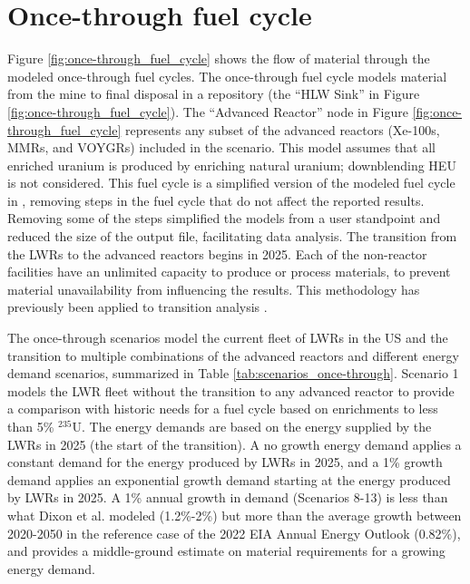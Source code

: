 \section{Once-through fuel cycle} \label{sec:once-through-methods}
Figure \ref{fig:once-through_fuel_cycle} shows the flow of material through 
the modeled once-through fuel cycles. The once-through fuel cycle models 
material from the mine to final disposal in a repository (the 
``HLW Sink'' in Figure \ref{fig:once-through_fuel_cycle}). The 
``Advanced Reactor'' node in Figure 
\ref{fig:once-through_fuel_cycle} represents any subset of the advanced 
reactors (Xe-100s, \glspl{MMR}, and VOYGRs) included 
in the scenario. This model assumes that all enriched uranium is produced 
by enriching natural uranium; downblending \gls{HEU} is not considered. 
This fuel cycle is a simplified version of the modeled fuel cycle in 
\cite{bachmann_enrichment_2021}, removing steps in the fuel cycle that 
do not affect the reported results. Removing some of the steps simplified 
the models from a user standpoint and reduced the size of the \Cyclus 
output file, facilitating data analysis. The transition from the 
\glspl{LWR} to the advanced reactors begins in 2025. Each of the non-reactor 
facilities have an unlimited capacity to produce or process materials,
to prevent material unavailability from influencing the results. 
This methodology has previously been applied to transition analysis 
\cite{djokic_application_2015}.



The once-through scenarios model the current fleet of \glspl{LWR} in the 
US and the transition to multiple 
combinations of the advanced reactors and different energy demand scenarios, 
summarized in Table \ref{tab:scenarios_once-through}. Scenario 1 models
the \gls{LWR} fleet without the transition to any advanced reactor to 
provide 
a comparison with historic needs for a fuel cycle 
based on enrichments to less than 5\% $^{235}$U. The energy demands are 
based on the energy supplied by the \glspl{LWR} in 2025 (the start of 
the transition). A no growth energy demand applies a constant demand for 
the energy produced by \glspl{LWR} in 2025, and a 1\% growth demand applies 
an exponential growth demand starting at the energy produced by 
\glspl{LWR} in 2025. A 1\% annual growth in 
demand (Scenarios 8-13) is less than what Dixon et al. \cite{dixon_estimated_2022} 
modeled
(1.2\%-2\%) but more than the average growth between 2020-2050 in the 
reference case of the 2022 \gls{EIA} Annual Energy Outlook 
\cite{us_energy_information_administration_annual_2022} (0.82\%), and 
provides a middle-ground estimate on material requirements for a growing 
energy demand. 

